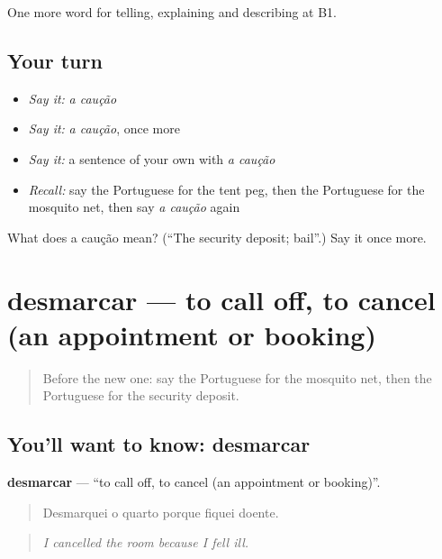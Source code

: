 \begin{grammarlens}[title={What you've built}]
One more word for telling, explaining and describing at B1.
\end{grammarlens}

\subsection*{Your turn}
\begin{itemize}
\raggedright
  \item \emph{Say it:} \emph{a caução}
  \item \emph{Say it:} \emph{a caução}, once more
  \item \emph{Say it:} a sentence of your own with \emph{a caução}
  \item \emph{Recall:} say the Portuguese for the tent peg, then the Portuguese for the mosquito net, then say \emph{a caução} again
\end{itemize}

\begin{tcolorbox}[breakable,colback=teal!4,colframe=teal!35!black,title={Before you move on}]
What does a caução mean? (\textquotedblleft{}The security deposit; bail\textquotedblright{}.) Say it once more.
\end{tcolorbox}
\section[desmarcar]{desmarcar — to call off, to cancel (an appointment or booking)}

\label{lesson:PT-C427-desmarcar}



\begin{quote}
Before the new one: say the Portuguese for the mosquito net, then the Portuguese for the security deposit.
\end{quote}

\subsection*{You'll want to know: desmarcar}
\textbf{desmarcar} — \textquotedblleft{}to call off, to cancel (an appointment or booking)\textquotedblright{}.

\begin{quote}
Desmarquei o quarto porque fiquei doente.
\end{quote}

\begin{quote}
\emph{I cancelled the room because I fell ill.}
\end{quote}

